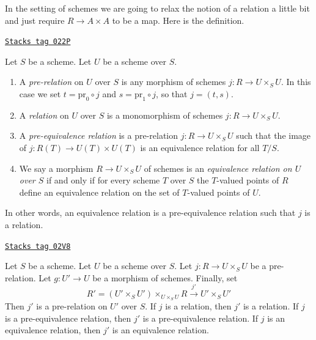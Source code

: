 \medskip\noindent
In the setting of schemes we are going to relax the notion of a
relation a little bit and just require $R \to A \times A$ to
be a map. Here is the definition.

\begin{definition}
\label{groupoids-definition-equivalence-relation}
\href{https://stacks.math.columbia.edu/tag/022P}{\texttt{Stacks tag 022P}}

Let $S$ be a scheme. Let $U$ be a scheme over $S$.
\begin{enumerate}
\item A {\it pre-relation} on $U$ over $S$ is any morphism
of schemes $j : R \to U \times_S U$. In this case we set
$t = \text{pr}_0 \circ j$ and $s = \text{pr}_1 \circ j$, so
that $j = (t, s)$.
\item A {\it relation} on $U$ over $S$ is a monomorphism
of schemes $j : R \to U \times_S U$.
\item A {\it pre-equivalence relation} is a pre-relation
$j : R \to U \times_S U$ such that the image of
$j : R(T) \to U(T) \times U(T)$ is an equivalence relation for
all $T/S$.
\item We say a morphism $R \to U \times_S U$ of schemes is
an {\it equivalence relation on $U$ over $S$}
if and only if for every scheme $T$ over $S$ the $T$-valued
points of $R$ define an equivalence relation
on the set of $T$-valued points of $U$.
\end{enumerate}
\end{definition}

In other words, an equivalence relation is a pre-equivalence relation
such that $j$ is a relation.

\begin{lemma}
\label{groupoids-lemma-restrict-relation}
\href{https://stacks.math.columbia.edu/tag/02V8}{\texttt{Stacks tag 02V8}}

Let $S$ be a scheme.
Let $U$ be a scheme over $S$.
Let $j : R \to U \times_S U$ be a pre-relation.
Let $g : U' \to U$ be a morphism of schemes.
Finally, set
$$
R' = (U' \times_S U')\times_{U \times_S U} R
\xrightarrow{j'}
U' \times_S U'
$$
Then $j'$ is a pre-relation on $U'$ over $S$.
If $j$ is a relation, then $j'$ is a relation.
If $j$ is a pre-equivalence relation, then $j'$ is a pre-equivalence relation.
If $j$ is an equivalence relation, then $j'$ is an equivalence relation.
\end{lemma}

